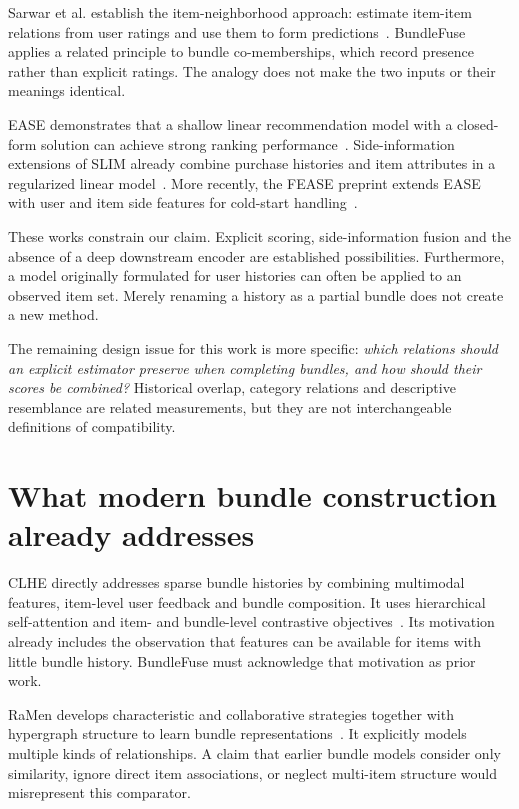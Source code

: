 \documentclass[11pt,a4paper]{article}
\begin{document}
Sarwar et al. establish the item-neighborhood approach: estimate item-item
relations from user ratings and use them to form predictions~\cite{sarwar}.
BundleFuse applies a related principle to bundle co-memberships, which record
presence rather than explicit ratings. The analogy does not make the two inputs
or their meanings identical.

EASE demonstrates that a shallow linear recommendation model with a closed-form
solution can achieve strong ranking performance~\cite{ease}. Side-information
extensions of SLIM already combine purchase histories and item attributes in a
regularized linear model~\cite{sslim}. More recently, the FEASE preprint extends EASE
with user and item side features for cold-start handling~\cite{fease}.

These works constrain our claim. Explicit scoring, side-information fusion and the
absence of a deep downstream encoder are established possibilities. Furthermore,
a model originally formulated for user histories can often be applied to an observed
item set. Merely renaming a history as a partial bundle does not create a new method.

The remaining design issue for this work is more specific: \emph{which relations
should an explicit estimator preserve when completing bundles, and how should their
scores be combined?} Historical overlap, category relations and descriptive resemblance
are related measurements, but they are not interchangeable definitions of compatibility.

\section{What modern bundle construction already addresses}
CLHE directly addresses sparse bundle histories by combining multimodal features,
item-level user feedback and bundle composition. It uses hierarchical self-attention
and item- and bundle-level contrastive objectives~\cite{clhe}. Its motivation already
includes the observation that features can be available for items with little bundle
history. BundleFuse must acknowledge that motivation as prior work.

RaMen develops characteristic and collaborative strategies together with hypergraph
structure to learn bundle representations~\cite{ramen}. It explicitly models multiple
kinds of relationships. A claim that earlier bundle models consider only similarity,
ignore direct item associations, or neglect multi-item structure would misrepresent
this comparator.
\end{document}
